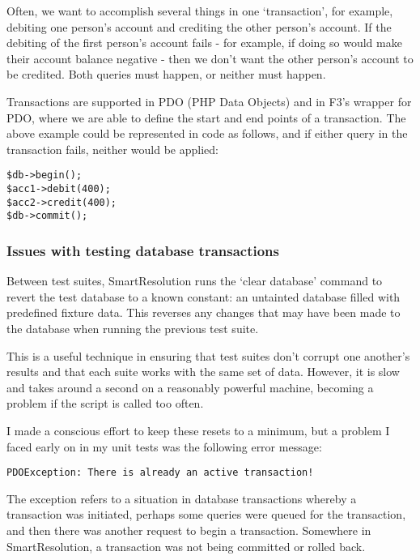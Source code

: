 Often, we want to accomplish several things in one `transaction', for example, debiting one person's account and crediting the other person's account. If the debiting of the first person's account fails - for example, if doing so would make their account balance negative - then we don't want the other person's account to be credited. Both queries must happen, or neither must happen.

Transactions are supported in PDO (PHP Data Objects) and in F3's wrapper for PDO, where we are able to define the start and end points of a transaction. The above example could be represented in code as follows, and if either query in the transaction fails, neither would be applied:

\begin{lstlisting}
$db->begin();
$acc1->debit(400);
$acc2->credit(400);
$db->commit();
\end{lstlisting}

\subsubsection{Issues with testing database transactions}

Between test suites, SmartResolution runs the `clear database' command to revert the test database to a known constant: an untainted database filled with predefined fixture data. This reverses any changes that may have been made to the database when running the previous test suite.

This is a useful technique in ensuring that test suites don't corrupt one another's results and that each suite works with the same set of data. However, it is slow and takes around a second on a reasonably powerful machine, becoming a problem if the script is called too often.

I made a conscious effort to keep these resets to a minimum, but a problem I faced early on in my unit tests was the following error message:

\begin{lstlisting}
PDOException: There is already an active transaction!
\end{lstlisting}

The exception refers to a situation in database transactions whereby a transaction was initiated, perhaps some queries were queued for the transaction, and then there was another request to begin a transaction. Somewhere in SmartResolution, a transaction was not being committed or rolled back.

